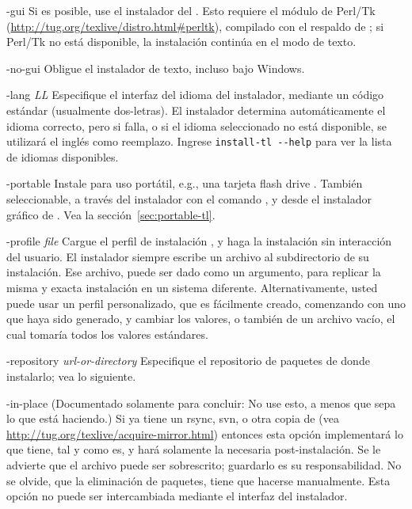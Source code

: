 \documentclass{article}
\begin{document}
\begin{ttdescription}
	\item[-gui] Si es posible, use el instalador del \GUI{}. Esto
		requiere el módulo de Perl/Tk
		(\url{http://tug.org/texlive/distro.html#perltk}),
		compilado con el respaldo de ; si Perl/Tk no
		está disponible, la instalación continúa en el modo de
		texto. 

\item[-no-gui] Obligue el instalador de texto, incluso bajo Windows. 

\item[-lang {\sl LL}] Especifique el interfaz del idioma del
	instalador, mediante un código estándar (usualmente
	dos-letras). El instalador determina automáticamente el idioma
	correcto, pero si falla, o si el idioma seleccionado no está
	disponible, se utilizará el inglés como reemplazo. Ingrese
	\verb|install-tl --help| para ver la lista de idiomas
	disponibles.

\item[-portable] Instale para uso portátil, e.g., una tarjeta flash
	drive \USB{}. También seleccionable, a través del instalador
	con el comando , y desde el instalador gráfico de
	\GUI{}. Vea la sección~\ref{sec:portable-tl}.

\item[-profile {\sl file}] Cargue el perfil de instalación ,
	y haga la instalación sin interacción del usuario. El
	instalador siempre escribe un archivo
	 al subdirectorio  de
	su instalación. Ese archivo, puede ser dado como un argumento,
	para replicar la misma y exacta instalación en un sistema
	diferente. Alternativamente, usted puede usar un perfil
	personalizado, que es fácilmente creado, comenzando con uno
	que haya sido generado, y cambiar los valores, o también de un
	archivo vacío, el cual tomaría todos los valores estándares.

\item[-repository {\sl url-or-directory}] Especifique el repositorio
	de paquetes de donde instalarlo; vea lo siguiente.


\item[-in-place] (Documentado solamente para concluir: No use esto, a
	menos que sepa lo que está haciendo.) Si ya tiene un rsync,
	svn, o otra copia de \TL{} (vea
	\url{http://tug.org/texlive/acquire-mirror.html}) entonces
	esta opción implementará lo que tiene, tal y como es, y hará
	solamente la necesaria post-instalación. Se le advierte que el
	archivo  puede ser sobrescrito;
	guardarlo es su responsabilidad. No se olvide, que la
	eliminación de paquetes, tiene que hacerse manualmente. Esta
	opción no puede ser intercambiada mediante el interfaz del
	instalador. 
\end{ttdescription}
\end{document}
